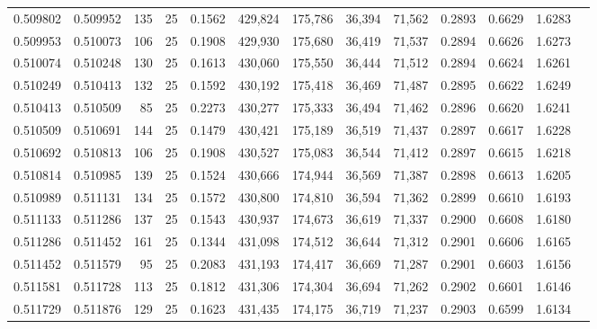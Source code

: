 \begin{tabular}{rrrrrrrrrrrrr}
0.509802 & 0.509952 &   135 &  25 &                                     0.1562 & 429,824 & 175,786 &  36,394 &  71,562 & 0.2893 & 0.6629 & 1.6283 \\
0.509953 & 0.510073 &   106 &  25 &                                     0.1908 & 429,930 & 175,680 &  36,419 &  71,537 & 0.2894 & 0.6626 & 1.6273 \\
0.510074 & 0.510248 &   130 &  25 &                                     0.1613 & 430,060 & 175,550 &  36,444 &  71,512 & 0.2894 & 0.6624 & 1.6261 \\
0.510249 & 0.510413 &   132 &  25 &                                     0.1592 & 430,192 & 175,418 &  36,469 &  71,487 & 0.2895 & 0.6622 & 1.6249 \\
0.510413 & 0.510509 &    85 &  25 &                                     0.2273 & 430,277 & 175,333 &  36,494 &  71,462 & 0.2896 & 0.6620 & 1.6241 \\
0.510509 & 0.510691 &   144 &  25 &                                     0.1479 & 430,421 & 175,189 &  36,519 &  71,437 & 0.2897 & 0.6617 & 1.6228 \\
0.510692 & 0.510813 &   106 &  25 &                                     0.1908 & 430,527 & 175,083 &  36,544 &  71,412 & 0.2897 & 0.6615 & 1.6218 \\
0.510814 & 0.510985 &   139 &  25 &                                     0.1524 & 430,666 & 174,944 &  36,569 &  71,387 & 0.2898 & 0.6613 & 1.6205 \\
0.510989 & 0.511131 &   134 &  25 &                                     0.1572 & 430,800 & 174,810 &  36,594 &  71,362 & 0.2899 & 0.6610 & 1.6193 \\
0.511133 & 0.511286 &   137 &  25 &                                     0.1543 & 430,937 & 174,673 &  36,619 &  71,337 & 0.2900 & 0.6608 & 1.6180 \\
0.511286 & 0.511452 &   161 &  25 &                                     0.1344 & 431,098 & 174,512 &  36,644 &  71,312 & 0.2901 & 0.6606 & 1.6165 \\
0.511452 & 0.511579 &    95 &  25 &                                     0.2083 & 431,193 & 174,417 &  36,669 &  71,287 & 0.2901 & 0.6603 & 1.6156 \\
0.511581 & 0.511728 &   113 &  25 &                                     0.1812 & 431,306 & 174,304 &  36,694 &  71,262 & 0.2902 & 0.6601 & 1.6146 \\
0.511729 & 0.511876 &   129 &  25 &                                     0.1623 & 431,435 & 174,175 &  36,719 &  71,237 & 0.2903 & 0.6599 & 1.6134 \\

\end{tabular}
